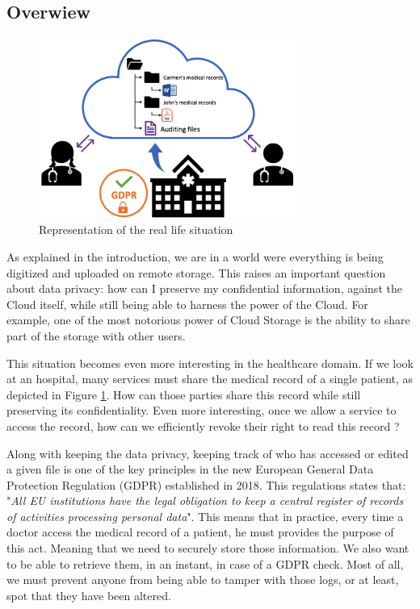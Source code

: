 \documentclass[../main.tex]{subfiles}
\begin{document}
\subsection{Overwiew}
\begin{figure}[bh]
    \centering
    \includegraphics[width=0.75\textwidth]{../images/problem_overview}
    
    \label{problem_description:overview}
    \caption{Representation of the real life situation}
\end{figure}
\par As explained in the introduction, we are in a world were everything is being digitized and uploaded on remote storage. This raises an important question about data privacy: how can I preserve my confidential information, against the Cloud itself, while still being able to harness the power of the Cloud. For example, one of the most notorious power of Cloud Storage is the ability to share part of the storage with other users. \par This situation becomes even more interesting in the healthcare domain. If we look at an hospital, many services must share the medical record of a single patient, as depicted in Figure \ref{problem_description:overview}. How can those parties share this record while still preserving its confidentiality. Even more interesting, once we allow a service to access the record, how can we efficiently revoke their right to read this record ?
\par Along with keeping the data privacy, keeping track of who has accessed or edited a given file is one of the key principles in the new European General Data Protection Regulation (GDPR) established in 2018. This regulations states that: "\textit{All EU institutions have the legal obligation to keep a central register of records of activities processing personal data}". This means that in practice, every time a doctor access the medical record of a patient, he must provides the purpose of this act. Meaning that we need to securely store those information. We also want to be able to retrieve them, in an instant, in case of a GDPR check. Most of all, we must prevent anyone from being able to tamper with those logs, or at least, spot that they have been altered.
\end{document}
